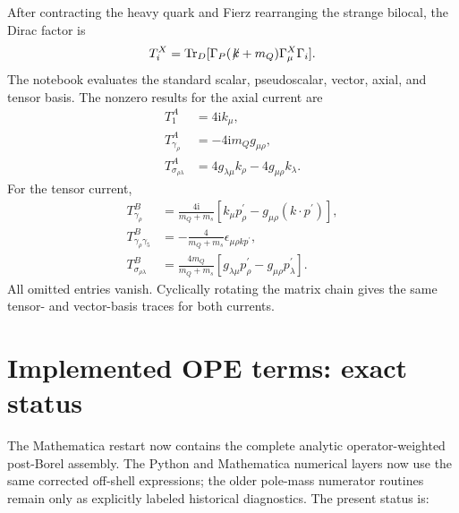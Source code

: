 \documentclass[11pt]{article}
\newcommand{\ii}{\mathrm{i}}
\newcommand{\Tr}{\operatorname{Tr}}
\newcommand{\slashedk}{\not\!k}
\begin{document}
After contracting the heavy quark and Fierz rearranging the strange bilocal,
the Dirac factor is
\begin{equation}
  T_i^X=\Tr_D[\Gamma_P(\slashedk+m_Q)\Gamma^X_\mu\Gamma_i].
\end{equation}
The notebook evaluates the standard scalar, pseudoscalar, vector, axial, and
tensor basis.  The nonzero results for the axial current are
\begin{align}
  T^A_{1}&=4\ii k_\mu,\\
  T^A_{\gamma_\rho}&=-4\ii m_Q g_{\mu\rho},\\
  T^A_{\sigma_{\rho\lambda}}
  &=4g_{\lambda\mu}k_\rho-4g_{\mu\rho}k_\lambda.
\end{align}
For the tensor current,
\begin{align}
  T^B_{\gamma_\rho}
  &=\frac{4\ii}{m_Q+m_s}
    [k_\mu p^{\prime}_\rho-g_{\mu\rho}(k\cdot p^{\prime})],\\
  T^B_{\gamma_\rho\gamma_5}
  &=-\frac{4}{m_Q+m_s}\epsilon_{\mu\rho k p^{\prime}},\\
  T^B_{\sigma_{\rho\lambda}}
  &=\frac{4m_Q}{m_Q+m_s}
    [g_{\lambda\mu}p^{\prime}_\rho-g_{\mu\rho}p^{\prime}_\lambda].
\end{align}
All omitted entries vanish.  Cyclically rotating the matrix chain gives the
same tensor- and vector-basis traces for both currents.

\clearpage
\section{Implemented OPE terms: exact status}

The Mathematica restart now contains the complete analytic operator-weighted
post-Borel assembly.  The Python and Mathematica numerical layers now use the
same corrected off-shell expressions; the older pole-mass numerator routines
remain only as explicitly labeled historical diagnostics.  The present status
is:
\end{document}
